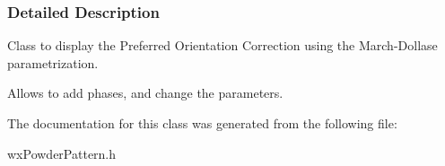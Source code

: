\subsubsection{\-Detailed \-Description}
\-Class to display the \-Preferred \-Orientation \-Correction using the \-March-\/\-Dollase parametrization. 

\-Allows to add phases, and change the parameters. 

\-The documentation for this class was generated from the following file\-:\begin{DoxyCompactItemize}
\item 
wx\-Powder\-Pattern.\-h\end{DoxyCompactItemize}
